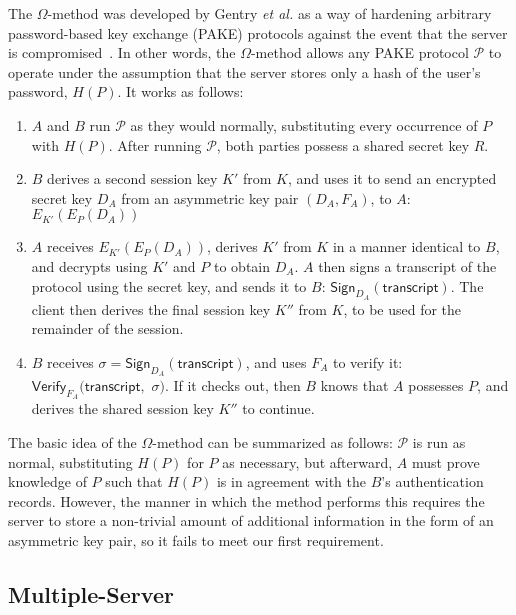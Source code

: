 The $\Omega$-method was developed by Gentry \textit{et al.} as a way
of hardening arbitrary password-based key exchange (PAKE) protocols
against the event that the server is compromised~\cite{gentry06}. In
other words, the $\Omega$-method allows any PAKE protocol
$\mathcal{P}$ to operate under the assumption that the server stores
only a hash of the user's password, $H(P)$. It works as follows:
\begin{enumerate}
\item $A$ and $B$ run $\mathcal{P}$ as they would normally,
  substituting every occurrence of $P$ with $H(P)$. After running
  $\mathcal{P}$, both parties possess a shared secret key $R$.
\item $B$ derives a second session key $K'$ from $K$, and uses it to
  send an encrypted secret key $D_A$ from an asymmetric key pair
  $(D_A, F_A)$, to $A$: $E_{K'}(E_{P}(D_A))$
\item $A$ receives $E_{K'}(E_{P}(D_A))$, derives $K'$ from $K$ in a
  manner identical to $B$, and decrypts using $K'$ and $P$ to obtain
  $D_A$. $A$ then signs a transcript of the protocol using the secret
  key, and sends it to $B$:
  $\mathsf{Sign}_{D_A}(\mathsf{transcript})$. The client then derives
  the final session key $K''$ from $K$, to be used for the remainder
  of the session.
\item $B$ receives $\sigma =
  \mathsf{Sign}_{D_A}(\mathsf{transcript})$, and uses $F_A$ to verify
  it: $\mathsf{Verify}_{F_A}(\mathsf{transcript},$ $\sigma)$. If it
  checks out, then $B$ knows that $A$ possesses $P$, and derives the
  shared session key $K''$ to continue.
\end{enumerate}
The basic idea of the $\Omega$-method can be summarized as follows:
$\mathcal{P}$ is run as normal, substituting $H(P)$ for $P$ as
necessary, but afterward, $A$ must prove knowledge of $P$ such that
$H(P)$ is in agreement with the $B$'s authentication records. However,
the manner in which the method performs this requires the server to
store a non-trivial amount of additional information in the form of an
asymmetric key pair, so it fails to meet our first requirement.

\subsection*{Multiple-Server}

